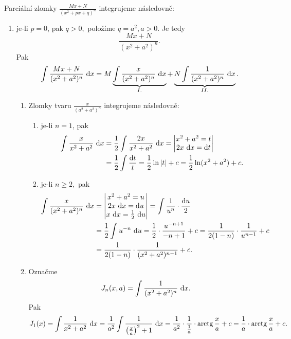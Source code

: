 \begin{pozn}
Parciální zlomky $\frac{Mx+N}{(x^2+px+q)^n}$ integrujeme následovně:
\begin{enumerate}[1.]
    \item je-li $p=0$, pak $q>0,$ položíme $q=a^2,a>0$. Je tedy
    $$\frac{Mx+N}{(x^2+a^2)^n}.$$
    Pak
    $$\int \frac{Mx+N}{(x^2+a^2)^n}\, \mathop{}\!\mathrm{d} x = M\underbrace{\int \frac{x}{(x^2+a^2)^n}\, \mathop{}\!\mathrm{d} x}_{I.} + \underbrace{N\int \frac{1}{(x^2+a^2)^n}\, \mathop{}\!\mathrm{d} x}_{II.}.$$
    \begin{enumerate}[$I.$]
    \item Zlomky tvaru $\frac{x}{(a^2+a^2)^n}$ integrujeme následovně:
    \begin{enumerate}[$i.$]
    \item je-li $n=1$, pak
    \begin{align*}
        \int \frac{x}{x^2+a^2}\, \mathop{}\!\mathrm{d} x &= \frac{1}{2}\int \frac{2x}{x^2+a^2}\, \mathop{}\!\mathrm{d} x = \begin{vmatrix}
            x^2+a^2=t \\
            2x\, \mathop{}\!\mathrm{d} x = \mathop{}\!\mathrm{d} t
        \end{vmatrix} \\
        &=\frac{1}{2} \int \frac{\mathop{}\!\mathrm{d} t}{t}=\frac{1}{2}\operatorname{ln} |t|+c=\frac{1}{2}\operatorname{ln}(x^2+a^2)+c.
    \end{align*}
   	\item je-li $n \geq 2,$ pak
    \begin{align*}
        \int \frac{x}{(x^2+a^2)^n}\, \mathop{}\!\mathrm{d} x &= \begin{vmatrix}
            x^2+a^2=u \\
            2x\, \mathop{}\!\mathrm{d} x = \mathop{}\!\mathrm{d} u \\
            x\, \mathop{}\!\mathrm{d} x = \frac{1}{2}\, \mathop{}\!\mathrm{d} u
        \end{vmatrix}=\int \frac{1}{u^n}\cdot \frac{\mathop{}\!\mathrm{d} u}{2} \\
        &= \frac{1}{2}\int u^{-n}\, \mathop{}\!\mathrm{d} u = \frac{1}{2}\cdot \frac{u^{-n+1}}{-n+1}+c =\frac{1}{2(1-n)}\cdot \frac{1}{u^{n-1}}+c \\
        & = \frac{1}{2(1-n) }\cdot\frac{1}{(x^2+a^2)^{n-1}}+c.
    \end{align*}
    \end{enumerate}
   	\item Označme
    $$J_n(x,a)=\int \frac{1}{(x^2+a^2)^n}\, \mathop{}\!\mathrm{d} x.$$ Pak
    $$
        J_1(x)= \int \frac{1}{x^2+a^2} \, \mathop{}\!\mathrm{d} x = \frac{1}{a^2}\int \frac{1}{\left ( \frac{x}{a} \right )^2+1 }\, \mathop{}\!\mathrm{d} x =\frac{1}{a^2}\cdot \frac{1}{\frac{1}{a}}\cdot \operatorname{arctg} \frac{x}{a} + c = \frac{1}{a}\cdot \operatorname{arctg} \frac{x}{a}+c.
$$
\end{enumerate}
\end{enumerate}
\end{pozn}
